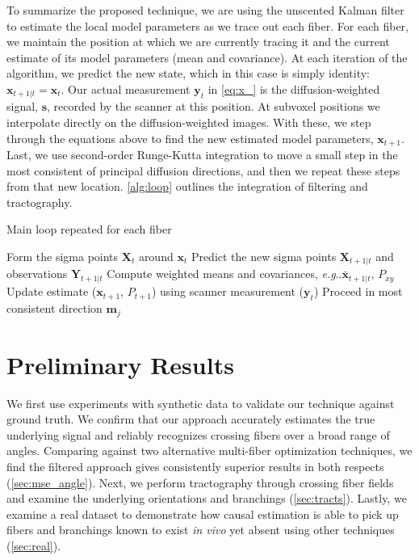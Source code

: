 \documentclass[letterpaper,hyperref,12pt]{gatech-thesis}
\makeatletter
\renewcommand{\v}[1]{\ensuremath{\mathbf #1}\xspace}
\DeclareRobustCommand\onedot{\futurelet\@let@token\@onedot}
\def\@onedot{\ifx\@let@token.\else.\null\fi\xspace}
\newcommand{\eg}{\textit{e.g}\onedot}
\newcommand{\s}{\v s}
\newcommand{\m}{\v m}
\newcommand{\x}{\v x}
\newcommand{\y}{\v y}
\newcommand{\X}{\v X}
\newcommand{\Y}{\v Y}
\makeatother
\begin{document}
To summarize the proposed technique, we are using the unscented Kalman filter
to estimate the local model parameters as we trace out each fiber.  For each
fiber, we maintain the position at which we are currently tracing it and the
current estimate of its model parameters (mean and covariance).  At each
iteration of the algorithm, we predict the new state, which in this case is
simply identity:  $\x_{t+1|t}=\x_t$.  Our actual measurement $\y_t$ in
\autoref{eq:x_} is the diffusion-weighted signal, \s, recorded by the scanner
at this position.  At subvoxel positions we interpolate directly on the
diffusion-weighted images.  With these, we step through the equations above to
find the new estimated model parameters, $\x_{t+1}$.  Last, we use
second-order Runge-Kutta integration to move a small step in the most
consistent of principal diffusion directions, and then we repeat these steps
from that new location.  \autoref{alg:loop} outlines the integration of
filtering and tractography.
\begin{algorithm}[t]
  \setlength\abovedisplayskip{2pt}
  \setlength\belowdisplayskip{2pt}
  \caption{Main loop repeated for each fiber}
  \label{alg:loop}
  \begin{algorithmic}[1]
    \REPEAT
      \STATE Form the sigma points $\X_t$ around $\x_t$
      \STATE Predict the new sigma points $\X_{t+1|t}$ and observations
      $\Y_{t+1|t}$
      \STATE Compute weighted means and covariances, \eg $\bar{\x}_{t+1|t}$, $P_{xy}$
      \STATE Update estimate ($\x_{t+1}$, $P_{t+1}$) using scanner
      measurement ($\y_t$)
      \STATE Proceed in most consistent direction $\m_j$
  \end{algorithmic}
\end{algorithm}






\chapter{Preliminary Results}

We first use experiments with synthetic data to validate our technique against
ground truth.  We confirm that our approach accurately estimates the true
underlying signal and reliably recognizes crossing fibers over a broad range
of angles.  Comparing against two alternative multi-fiber optimization
techniques, we find the filtered approach gives consistently superior results
in both respects (\autoref{sec:mse_angle}).
%
Next, we perform tractography through crossing fiber fields and examine the
underlying orientations and branchings (\autoref{sec:tracts}).
%
Lastly, we examine a real dataset to demonstrate how causal estimation is able
to pick up fibers and branchings known to exist \textit{in vivo} yet absent
using other techniques (\autoref{sec:real}).
\end{document}
